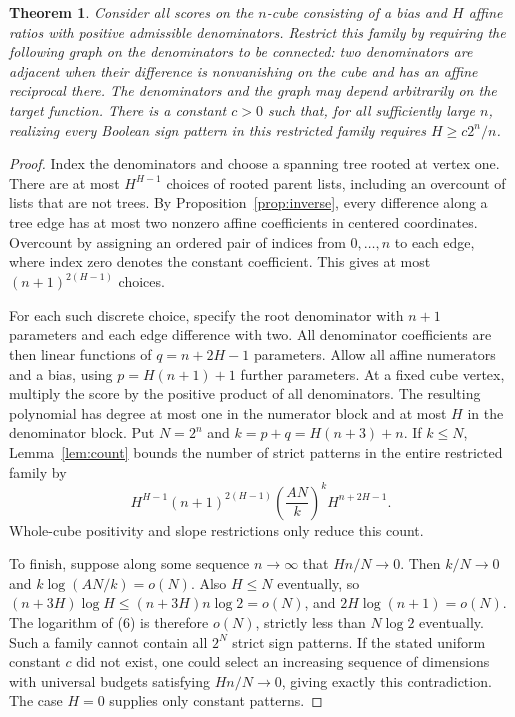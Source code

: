 \documentclass[11pt]{article}
\newtheorem{theorem}{Theorem}
\begin{document}
\begin{theorem}\label{thm:connected}
Consider all scores on the $n$-cube consisting of a bias and $H$ affine
ratios with positive admissible denominators. Restrict this family by
requiring the following graph on the denominators to be connected:
two denominators are adjacent when their difference is nonvanishing
on the cube and has an affine reciprocal there. The denominators and
the graph may depend arbitrarily on the target function.
There is a constant $c>0$ such that, for all sufficiently large $n$,
realizing every Boolean sign pattern in this restricted family
requires $H\ge c2^n/n$.
\end{theorem}
\begin{proof}
Index the denominators and choose a spanning tree rooted at vertex one.
There are at most $H^{H-1}$ choices of rooted parent lists, including
an overcount of lists that are not trees. By
Proposition~\ref{prop:inverse}, every difference along a tree edge
has at most two nonzero affine coefficients in centered coordinates.
Overcount by assigning an ordered pair of indices from $0,\ldots,n$
to each edge, where index zero denotes the constant coefficient.
This gives at most $(n+1)^{2(H-1)}$ choices.

For each such discrete choice, specify the root denominator with
$n+1$ parameters and each edge difference with two. All denominator
coefficients are then linear functions of
$q=n+2H-1$ parameters. Allow all affine numerators and a bias,
using $p=H(n+1)+1$ further parameters. At a fixed cube vertex,
multiply the score by the positive product of all denominators.
The resulting polynomial has degree at most one in the numerator
block and at most $H$ in the denominator block. Put
$N=2^n$ and $k=p+q=H(n+3)+n$. If $k\le N$, Lemma~\ref{lem:count}
bounds the number of strict patterns in the entire restricted family by
\[
 H^{H-1}(n+1)^{2(H-1)}
 \left(\frac{AN}{k}\right)^k H^{n+2H-1}.
 \tag{6}
\]
Whole-cube positivity and slope restrictions only reduce this count.

To finish, suppose along some sequence $n\to\infty$ that
$Hn/N\to0$. Then $k/N\to0$ and
$k\log(AN/k)=o(N)$. Also $H\le N$ eventually, so
$(n+3H)\log H\le(n+3H)n\log2=o(N)$, and
$2H\log(n+1)=o(N)$. The logarithm of (6) is therefore $o(N)$,
strictly less than $N\log2$ eventually. Such a family cannot contain
all $2^N$ strict sign patterns. If the stated uniform constant $c$
did not exist, one could select an increasing sequence of dimensions
with universal budgets satisfying $Hn/N\to0$, giving exactly this
contradiction. The case $H=0$ supplies only constant patterns.
\end{proof}
\end{document}
